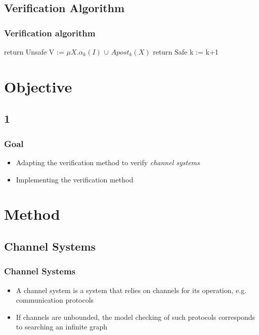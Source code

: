 \documentclass[handout]{beamer}
\begin{document}
\subsection{Verification Algorithm}
\begin{frame}
  \frametitle{Verification algorithm} %
  \footnotesize
  \begin{algorithmic}[1]
     
    \State return Unsafe
    \EndIf
    \State V := $\mu X.\alpha_k(I)$ $\cup$ $Apost_k(X)$ 
     
    \State return Safe
    \EndIf
    \State k := k+1 
    \EndWhile
  \end{algorithmic}
\end{frame}

\section{Objective}
\subsection*{1}
\begin{frame}
  \frametitle{Goal}
  \begin{itemize}
  \item
    Adapting the verification method to verify \emph{channel systems}
  \item
    Implementing the verification method
  \end{itemize}
\end{frame}

\begin{frame}
  \tableofcontents
\end{frame}


\section{Method}
\subsection{Channel Systems}
\begin{frame}
  \frametitle{Channel Systems}
  \begin{itemize}
  \item
    A channel system is a system that relies on channels for its operation, e.g. communication protocols
  \item
    If channels are unbounded, the model checking of such protocols corresponds to searching an infinite graph
  \end{itemize}
\end{frame}
\end{document}
